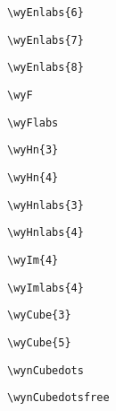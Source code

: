 \documentclass[11pt,a4paper,onecolumn]{article}
\begin{document}
\verb!\wyEnlabs{6}!	\begin{wythoff}\end{wythoff}

\verb!\wyEnlabs{7}!	\begin{wythoff}\end{wythoff}

\verb!\wyEnlabs{8}!	\begin{wythoff}\end{wythoff}

\verb!\wyF!	\begin{wythoff}\wyF\end{wythoff}

\verb!\wyFlabs!	\begin{wythoff}\wyFlabs\end{wythoff}

\verb!\wyHn{3}!	\begin{wythoff}\end{wythoff}

\verb!\wyHn{4}!	\begin{wythoff}\end{wythoff}

\verb!\wyHnlabs{3}!	\begin{wythoff}\end{wythoff}

\verb!\wyHnlabs{4}!	\begin{wythoff}\end{wythoff}


\verb!\wyIm{4}!	\begin{wythoff}\end{wythoff}

\verb!\wyImlabs{4}!	\begin{wythoff}\end{wythoff}

\verb!\wyCube{3}!	\begin{wythoff}\end{wythoff}
 
\verb!\wyCube{5}!	\begin{wythoff}\end{wythoff}
 
\verb!\wynCubedots!	\begin{wythoff}\wynCubedots\end{wythoff}

\verb!\wynCubedotsfree!	\begin{wythoff}\wynCubedotsfree\end{wythoff}
\end{document}
